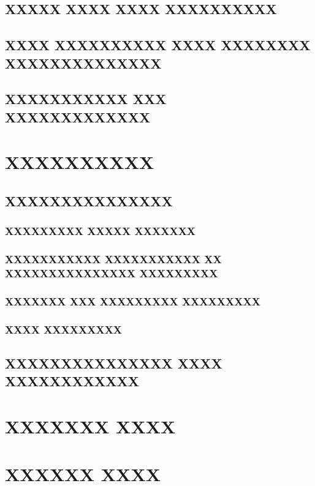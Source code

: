 \documentclass{acmart}
\begin{document}
\subsection{XXXXX XXXX XXXX XXXXXXXXXX}
\subsection{XXXX XXXXXXXXXX XXXX XXXXXXXX XXXXXXXXXXXXXX}
\subsection{XXXXXXXXXXX XXX XXXXXXXXXXXXX}
\section{XXXXXXXXXX}
\subsection{XXXXXXXXXXXXXXX}
\subsubsection{XXXXXXXXX XXXXX XXXXXXX}
\subsubsection{XXXXXXXXXXX XXXXXXXXXXX XX XXXXXXXXXXXXXXX XXXXXXXXX}
\subsubsection{XXXXXXX XXX XXXXXXXXX XXXXXXXXX}
\subsubsection{XXXX XXXXXXXXX}
\subsection{XXXXXXXXXXXXXXX XXXX XXXXXXXXXXXX}
\section{XXXXXXX XXXX}
\section{XXXXXX XXXX}
\end{document}
